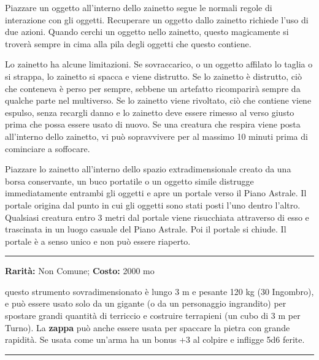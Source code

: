 \begin{multicols}{2}
Piazzare un oggetto all'interno dello zainetto segue le normali regole di interazione con gli oggetti. Recuperare un oggetto dallo zainetto richiede l'uso di due azioni. Quando cerchi un oggetto nello zainetto, questo magicamente si troverà sempre in cima alla pila degli oggetti che questo contiene.

Lo zainetto ha alcune limitazioni. Se sovraccarico, o un oggetto affilato lo taglia o si strappa, lo zainetto si spacca e viene distrutto. Se lo zainetto è distrutto, ciò che conteneva è perso per sempre, sebbene un artefatto ricomparirà sempre da qualche parte nel multiverso. Se lo zainetto viene rivoltato, ciò che contiene viene espulso, senza recargli danno e lo zainetto deve essere rimesso al verso giusto prima che possa essere usato di nuovo. Se una creatura che respira viene posta all'interno dello zainetto, vi può sopravvivere per al massimo 10 minuti prima di cominciare a soffocare.

Piazzare lo zainetto all'interno dello spazio extradimensionale creato da una borsa conservante, un buco portatile o un oggetto simile distrugge immediatamente entrambi gli oggetti e apre un portale verso il Piano Astrale. Il portale origina dal punto in cui gli oggetti sono stati posti l'uno dentro l'altro. Qualsiasi creatura entro 3 metri dal portale viene risucchiata attraverso di esso e trascinata in un luogo casuale del Piano Astrale. Poi il portale si chiude. Il portale è a senso unico e non può essere riaperto.

\smallskip\noindent\rule{\linewidth}{2pt}  \hypertarget{ZappadeiTitani}{}\smallskip{}\noindent\label{ZappadeiTitani}

\textbf{Rarità:} Non Comune; \textbf{Costo:} 2000 mo

questo strumento sovradimensionato è lungo 3 m e pesante 120 kg (30 Ingombro), e può essere usato solo da un gigante (o da un personaggio ingrandito) per spostare grandi quantità di terriccio e costruire terrapieni (un cubo di 3 m per Turno). La \textbf{zappa} può anche essere usata per spaccare la pietra con grande rapidità. Se usata come un'arma ha un bonus +3 al colpire e infligge 5d6 ferite.

\smallskip\noindent\rule{\linewidth}{2pt}  \hypertarget{ZoccolidellaVelocità}{}\smallskip{}\noindent\label{ZoccolidellaVelocità}


\end{multicols}
